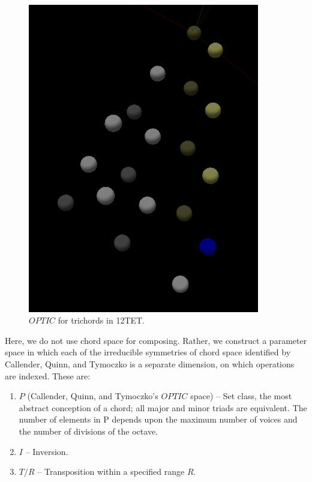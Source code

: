 \documentclass[english,11pt,letterpaper,onecolumn]{scrartcl}
\numberwithin{equation}{section}
\begin{document}
    \begin{figure}
        \centerline{\includegraphics[width = 0.9\textwidth]{opttic}}
        \caption{\label{fig:optic} 
            $OPTIC$ for trichords in 12TET.}
    \end{figure}
    
    Here, we do not use chord space for composing. Rather, we construct a 
parameter 
    space in which each of the irreducible symmetries of chord space identified 
by 
    Callender, Quinn, and Tymoczko is a separate dimension, on which operations 
are 
    indexed. These are:
    
    \begin{enumerate}
        \item $P$ (Callender, Quinn, and Tymoczko's $OPTIC$ space) -- Set 
class, the 
        most abstract conception of a chord; all major and minor triads are 
equivalent. 
        The number of elements in P depends upon the maximum number of voices 
and the 
        number of divisions of the octave.
        \item $I$ -- Inversion.
        \item $T/R$ -- Transposition within a specified range $R$.
    \end{enumerate}
    
\end{document}
